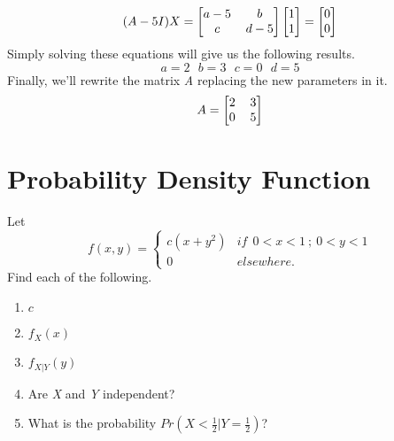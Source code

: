 \documentclass[12pt]{article}
\numberwithin{equation}{section}
\numberwithin{table}{section}
\numberwithin{figure}{section}
\begin{document}
$$
(A - 5 I)X = 
\renewcommand\arraystretch{1}
\setlength\arraycolsep{6pt}
\begin{bmatrix}
a-5 & b\\	
c & d-5\\
\end{bmatrix}
\begin{bmatrix}
1\\
1 \\
\end{bmatrix} = \begin{bmatrix}
0\\
0 \\
\end{bmatrix}
$$
Simply solving these equations will give us the following results.
$$
	\boxed{a = 2}
	\ \ \
	\boxed{b = 3}
	\ \ \
	\boxed{c = 0}
	\ \ \
	\boxed{d = 5}
$$
Finally, we'll rewrite the matrix \textit{A} replacing the new parameters in it.
$$
A = 
\renewcommand\arraystretch{1}
\setlength\arraycolsep{6pt}
\begin{bmatrix}
2 & 3\\	
0 & 5\\
\end{bmatrix}
$$
\newpage
\section{Probability Density Function}
Let
\renewcommand\arraystretch{1.2}
\setlength\arraycolsep{10pt}
\[f(x, y) = \left\{
\begin{array}{lr}
c(x + y^2) &  if \ \ 0 < x < 1\ ;\ 0 < y < 1\\
0 &  elsewhere.
\end{array}
\right.
\]
Find each of the following.

\begin{enumerate}[label=(\alph*)]
	\item \textit{$c$}
	
	\item \textit{$f_X (x)$}
	
	\item \textit{$f_{X|Y} (y)$}
	
	\item Are \textit{X} and \textit{Y} independent?
	
	\item What is the probability $Pr(X<\frac{1}{2}  | Y = \frac{1}{2})
	$?
	 
\end{enumerate}
\end{document}
